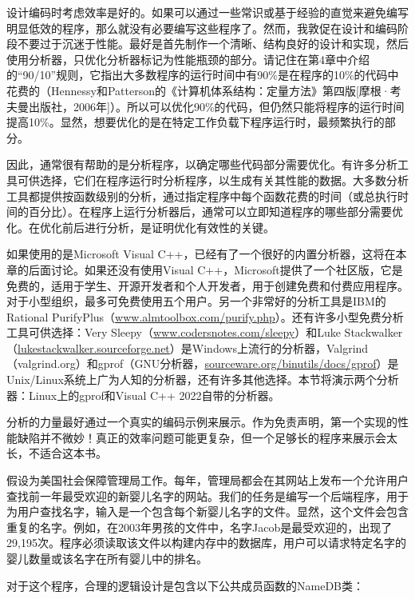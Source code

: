 
设计编码时考虑效率是好的。如果可以通过一些常识或基于经验的直觉来避免编写明显低效的程序，那么就没有必要编写这些程序了。然而，我敦促在设计和编码阶段不要过于沉迷于性能。最好是首先制作一个清晰、结构良好的设计和实现，然后使用分析器，只优化分析器标记为性能瓶颈的部分。请记住在第4章中介绍的“90/10”规则，它指出大多数程序的运行时间中有90\%是在程序的10\%的代码中花费的（Hennessy和Patterson的《计算机体系结构：定量方法》第四版[摩根·考夫曼出版社，2006年]）。所以可以优化90\%的代码，但仍然只能将程序的运行时间提高10\%。显然，想要优化的是在特定工作负载下程序运行时，最频繁执行的部分。

因此，通常很有帮助的是分析程序，以确定哪些代码部分需要优化。有许多分析工具可供选择，它们在程序运行时分析程序，以生成有关其性能的数据。大多数分析工具都提供按函数级别的分析，通过指定程序中每个函数花费的时间（或总执行时间的百分比）。在程序上运行分析器后，通常可以立即知道程序的哪些部分需要优化。在优化前后进行分析，是证明优化有效性的关键。

如果使用的是Microsoft Visual C++，已经有了一个很好的内置分析器，这将在本章的后面讨论。如果还没有使用Visual C++，Microsoft提供了一个社区版，它是免费的，适用于学生、开源开发者和个人开发者，用于创建免费和付费应用程序。对于小型组织，最多可免费使用五个用户。另一个非常好的分析工具是IBM的Rational PurifyPlus（\url{www.almtoolbox.com/purify.php}）。还有许多小型免费分析工具可供选择：Very Sleepy（\url{www.codersnotes.com/sleepy}）和Luke Stackwalker（\url{lukestackwalker.sourceforge.net}）是Windows上流行的分析器，Valgrind（valgrind.org）和gprof（GNU分析器，\url{sourceware.org/binutils/docs/gprof}）是Unix/Linux系统上广为人知的分析器，还有许多其他选择。本节将演示两个分析器：Linux上的gprof和Visual C++ 2022自带的分析器。


分析的力量最好通过一个真实的编码示例来展示。作为免责声明，第一个实现的性能缺陷并不微妙！真正的效率问题可能更复杂，但一个足够长的程序来展示会太长，不适合这本书。

假设为美国社会保障管理局工作。每年，管理局都会在其网站上发布一个允许用户查找前一年最受欢迎的新婴儿名字的网站。我们的任务是编写一个后端程序，用于为用户查找名字，输入是一个包含每个新婴儿名字的文件。显然，这个文件会包含重复的名字。例如，在2003年男孩的文件中，名字Jacob是最受欢迎的，出现了29,195次。程序必须读取该文件以构建内存中的数据库，用户可以请求特定名字的婴儿数量或该名字在所有婴儿中的排名。


对于这个程序，合理的逻辑设计是包含以下公共成员函数的NameDB类：

